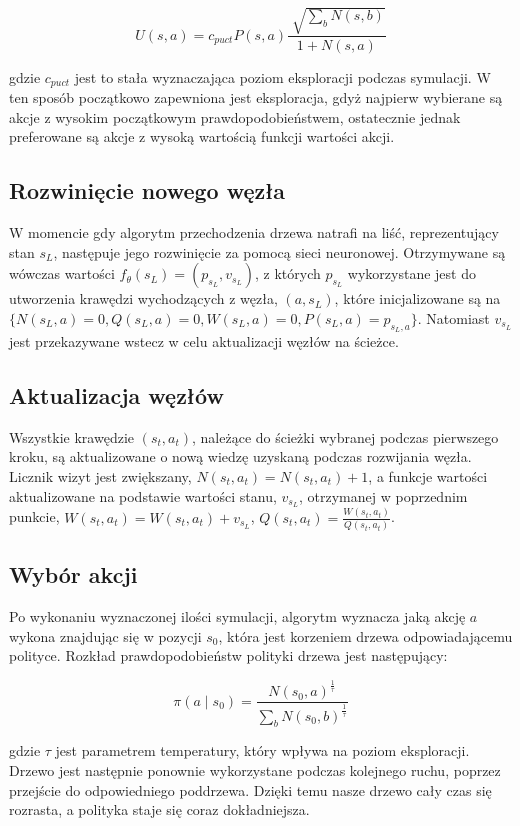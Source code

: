 \documentclass[licencjacka]{pracamgr}
\begin{document}
$$ U(s,a) = c_{puct} P(s,a) \frac{\sqrt[]{\sum_b N(s,b)}}{1 + N(s,a)} $$ 

gdzie $c_{puct}$ jest to stała wyznaczająca poziom eksploracji podczas symulacji. W ten sposób początkowo zapewniona jest eksploracja, gdyż najpierw wybierane są akcje z wysokim początkowym prawdopodobieństwem, ostatecznie jednak preferowane są akcje z wysoką wartością funkcji wartości akcji.

\subsection{Rozwinięcie nowego węzła}

W momencie gdy algorytm przechodzenia drzewa natrafi na liść, reprezentujący stan $s_L$, następuje jego rozwinięcie za pomocą sieci neuronowej. Otrzymywane są wówczas wartości $f_\theta(s_L) = (p_{s_L}, v_{s_L})$, z których $p_{s_L}$ wykorzystane jest do utworzenia krawędzi wychodzących z węzła, $(a, s_L)$, które inicjalizowane są na $\big\{N(s_L, a) = 0, Q(s_L, a) = 0, W(s_L, a) = 0, P(s_L, a) = p_{s_L, a}  \big\}$. Natomiast $v_{s_L}$ jest przekazywane wstecz w celu aktualizacji węzłów na ścieżce.

\subsection{Aktualizacja węzłów}

Wszystkie krawędzie $(s_t, a_t)$, należące do ścieżki wybranej podczas pierwszego kroku, są aktualizowane o nową wiedzę uzyskaną podczas rozwijania węzła. Licznik wizyt jest zwiększany, $N(s_t, a_t) = N(s_t, a_t) + 1$, a funkcje wartości aktualizowane na podstawie wartości stanu, $v_{s_L}$, otrzymanej w poprzednim punkcie, $W(s_t, a_t) = W(s_t, a_t) + v_{s_L}$, $Q(s_t, a_t) = \frac{W(s_t, a_t)}{Q(s_t, a_t)}$.
\subsection{Wybór akcji}

Po wykonaniu wyznaczonej ilości symulacji, algorytm wyznacza jaką akcję $a$ wykona znajdując się w pozycji $s_0$, która jest korzeniem drzewa odpowiadającemu polityce. Rozkład prawdopodobieństw polityki drzewa jest następujący:

$$
\pi(a \mid s_0) = \frac {N(s_0, a)^{\frac{1}{\tau}}}{\sum_b N(s_0, b)^{\frac{1}{\tau}}}
$$

gdzie $\tau$ jest parametrem temperatury, który wpływa na poziom eksploracji. Drzewo jest następnie ponownie wykorzystane podczas kolejnego ruchu, poprzez przejście do odpowiedniego poddrzewa. Dzięki temu nasze drzewo cały czas się rozrasta, a polityka staje się coraz dokładniejsza.
\end{document}
